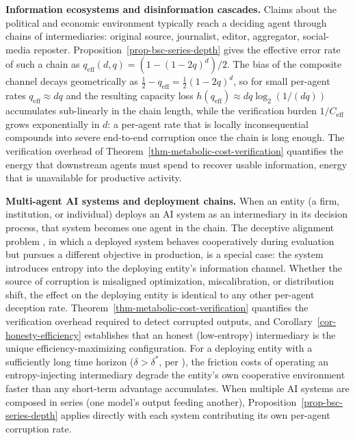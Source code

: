 \documentclass[11pt]{article}
\theoremstyle{plain}
\theoremstyle{definition}
\theoremstyle{remark}
\begin{document}
\textbf{Information ecosystems and disinformation cascades.} Claims
about the political and economic environment typically reach a deciding
agent through chains of intermediaries: original source, journalist,
editor, aggregator, social-media reposter.
Proposition~\ref{prop-bsc-series-depth} gives the effective error rate
of such a chain as \(q_{\text{eff}}(d, q) = (1 - (1 - 2q)^d)/2\). The
bias of the composite channel decays geometrically as
\(\tfrac{1}{2} - q_{\text{eff}} = \tfrac{1}{2}(1 - 2q)^d\), so for small
per-agent rates \(q_{\text{eff}} \approx d q\) and the resulting
capacity loss \(h(q_{\text{eff}}) \approx d q \log_2(1/(d q))\)
accumulates sub-linearly in the chain length, while the verification
burden \(1/C_{\text{eff}}\) grows exponentially in \(d\): a per-agent
rate that is locally inconsequential compounds into severe end-to-end
corruption once the chain is long enough. The verification overhead of
Theorem~\ref{thm-metabolic-cost-verification} quantifies the energy that
downstream agents must spend to recover usable information, energy that
is unavailable for productive activity.

\textbf{Multi-agent AI systems and deployment chains.} When an entity (a
firm, institution, or individual) deploys an AI system as an
intermediary in its decision process, that system becomes one agent in
the chain. The deceptive alignment problem \citep{Hubinger2019}, in
which a deployed system behaves cooperatively during evaluation but
pursues a different objective in production, is a special case: the
system introduces entropy into the deploying entity's information
channel. Whether the source of corruption is misaligned optimization,
miscalibration, or distribution shift, the effect on the deploying
entity is identical to any other per-agent deception rate.
Theorem~\ref{thm-metabolic-cost-verification} quantifies the
verification overhead required to detect corrupted outputs, and
Corollary~\ref{cor-honesty-efficiency} establishes that an honest
(low-entropy) intermediary is the unique efficiency-maximizing
configuration. For a deploying entity with a sufficiently long time
horizon (\(\delta > \delta^*\), per \citep{TC-V}), the friction costs of
operating an entropy-injecting intermediary degrade the entity's own
cooperative environment faster than any short-term advantage
accumulates. When multiple AI systems are composed in series (one
model's output feeding another), Proposition~\ref{prop-bsc-series-depth}
applies directly with each system contributing its own per-agent
corruption rate.
\end{document}
